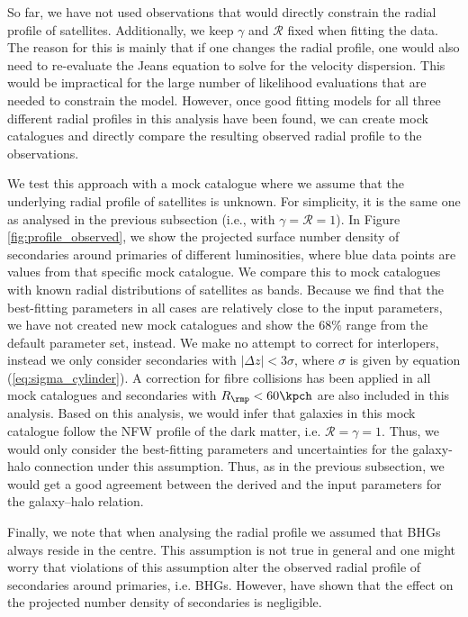 \documentclass[fleqn,usenatbib,useAMS]{mnras}
\begin{document}
	So far, we have not used observations that would directly constrain the radial profile of satellites. Additionally, we keep $\gamma$ and $\mathcal{R}$ fixed when fitting the data. The reason for this is mainly that if one changes the radial profile, one would also need to re-evaluate the Jeans equation to solve for the velocity dispersion. This would be impractical for the large number of likelihood evaluations that are needed to constrain the model. However, once good fitting models for all three different radial profiles in this analysis have been found, we can create mock catalogues and directly compare the resulting observed radial profile to the observations.
	
	We test this approach with a mock catalogue where we assume that the underlying radial profile of satellites is unknown. For simplicity, it is the same one as analysed in the previous subsection (i.e., with $\gamma = \mathcal{R} = 1$). In Figure \ref{fig:profile_observed}, we show the projected surface number density of secondaries around primaries of different luminosities, where blue data points are values from that specific mock catalogue. We compare this to mock catalogues with known radial distributions of satellites as bands. Because we find that the best-fitting parameters in all cases are relatively close to the input parameters, we have not created new mock catalogues and show the $68\%$ range from the default parameter set, instead.  We make no attempt to correct for interlopers, instead we only consider secondaries with $|\Delta z| < 3 \sigma$, where $\sigma$ is given by equation (\ref{eq:sigma_cylinder}). A correction for fibre collisions has been applied in all mock catalogues and secondaries with $R_\rmp < 60 \kpch$ are also included in this analysis. Based on this analysis, we would infer that galaxies in this mock catalogue follow the NFW profile of the dark matter, i.e. $\mathcal{R} = \gamma = 1$. Thus, we would only consider the best-fitting parameters and uncertainties for the galaxy-halo connection under this assumption. Thus, as in the previous subsection, we would get a good agreement between the derived and the input parameters for the galaxy--halo relation.
	
	Finally, we note that when analysing the radial profile we assumed that BHGs always reside in the centre. This assumption is not true in general and one might worry that violations of this assumption alter the observed radial profile of secondaries around primaries, i.e. BHGs. However, \cite{Lange+18a} have shown that the effect on the projected number density of secondaries is negligible.
	
\end{document}
